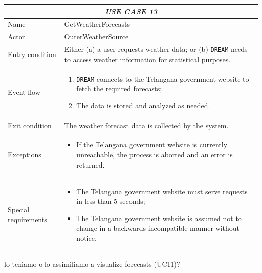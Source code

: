\documentclass{article}
\begin{document}
\centering
\begin{longtable}{|p{3.5cm}|m{8cm}|}
 \hline
 \multicolumn{2}{|c|}{\cellcolor{white}\emph{USE CASE 13}} \\
 \endfirsthead
 \endhead
 \endfoot
 \endlastfoot
 \hline
 Name & GetWeatherForecasts\\
 \hline
 Actor & OuterWeatherSource\\
 \hline
 Entry condition & Either (a) a user requests weather data; or (b) \verb|DREAM| needs to access weather information for statistical purposes.\\
 \hline
 Event flow & \begin{enumerate}
    \item \verb|DREAM| connects to the Telangana government website to fetch the required forecasts;
    \item \color{red} The data is stored and analyzed as needed. \color{black}
 \end{enumerate}\\
 \hline
 Exit condition & The weather forecast data is collected by the system.\\
 \hline
 Exceptions & \begin{itemize}
     \item If the Telangana government website is currently unreachable, the process is aborted and an error is returned.
 \end{itemize}\\
 \hline
 Special requirements &\begin{itemize}
    \color{red}
     \item The Telangana government website must serve requests in less than 5 seconds;
     \item The Telangana government website is assumed not to change in a backwards-incompatible manner without notice.
     \color{black}
 \end{itemize}\\
 \hline
\end{longtable}

\color{red} lo teniamo o lo assimiliamo a visualize forecasts (UC11)? \color{black}

\end{document}
